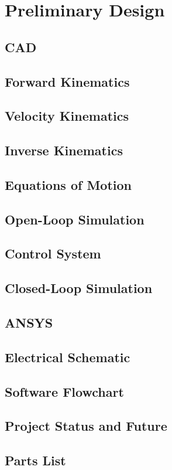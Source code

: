 \documentclass[12pt]{report}
\begin{document}
\section{Preliminary Design}
\subsection{CAD}
\subsection{Forward Kinematics}
\subsection{Velocity Kinematics}
\subsection{Inverse Kinematics}
\subsection{Equations of Motion}
\subsection{Open-Loop Simulation}
\subsection{Control System}
\subsection{Closed-Loop Simulation}
\subsection{ANSYS}
\subsection{Electrical Schematic}
\subsection{Software Flowchart}
\subsection{Project Status and Future}
\subsection{Parts List}
\end{document}
